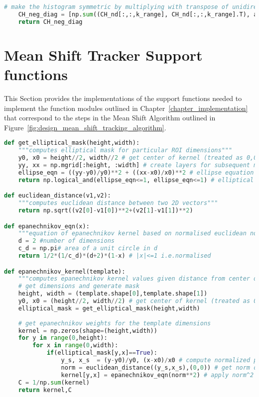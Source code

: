 \begin{lstlisting}[language=Python, caption={Additional functions for Co-occurrence Histogram Detection}, captionpos=b, label={lst:supportCH}]
    # make the histogram symmetric by multiplying with transpose of unidirectional cooccurance histogram
    CH_neg_diag = [np.sum((CH_nd[:,:,k_range], CH_nd[:,:,k_range].T), axis=0) for k_range in range(0,nd-1)]
    return CH_neg_diag  

\end{lstlisting}

\section{Mean Shift Tracker Support functions}\label{appendix_supportMS}
This Section provides the implementations of the support functions needed to
implement the function modules outlined in Chapter~\ref{chapter_implementation}
that correspond to the steps in the Mean Shift Algorithm outlined in
Figure~\ref{fig:design_mean_shift_tracking_algorithm}.

\begin{lstlisting}[language=Python, caption={Additional functions for Mean Shift Tracker Impementation}, captionpos=b, label={lst:support_MS}]
def get_elliptical_mask(height,width):
    """computes elliptical mask for particular ROI dimensions"""
    y0, x0 = height//2, width//2 # get center of kernel (treated as 0,0) - note these are also hy and hx 
    yy, xx = np.mgrid[:height, :width] # create layers for subsequent mask
    ellipse_eqn = ((yy-y0)/y0)**2 + ((xx-x0)/x0)**2 # ellipse equation
    return np.logical_and(ellipse_eqn<=1, ellipse_eqn<=1) # elliptical mask for kernel

def euclidean_distance(v1,v2):
    """computes euclidean distance between two 2D vectors"""
    return np.sqrt((v2[0]-v1[0])**2+(v2[1]-v1[1])**2)

def epanechnikov_eqn(x):
    """equation of epanechnikov kernel based on normalised euclidean norm squared"""
    d = 2 #number of dimensions
    c_d = np.pi# area of a unit circle in d  
    return 1/2*(1/c_d)*(d+2)*(1-x) # |x|<=1 i.e.normalised

def epanechnikov_kernel(template):
    """computes epanechnikov kernel values given distance from center of kernel"""    
    # get dimensions and generate mask
    height, width = (template.shape[0],template.shape[1])
    y0, x0 = (height//2, width//2) # get center of kernel (treated as 0,0) - note these are also hy and hx 
    elliptical_mask = get_elliptical_mask(height,width) 
    
    # get epanechnikov weights for the template dimensions
    kernel = np.zeros(shape=(height,width)) 
    for y in range(0,height):
        for x in range(0,width):
            if(elliptical_mask[y,x]==True):
                y_s, x_s  = (y-y0)/y0, (x-x0)/x0 # compute normalized point 
                norm = euclidean_distance((y_s,x_s),(0,0)) # get norm of normalized point (x_i*) i.e y0=hy, x0=hx
                kernel[y,x] = epanechnikov_eqn(norm**2) # apply norm^2 to epanechnikov equation
    C = 1/np.sum(kernel)
    return kernel,C
\end{lstlisting}

